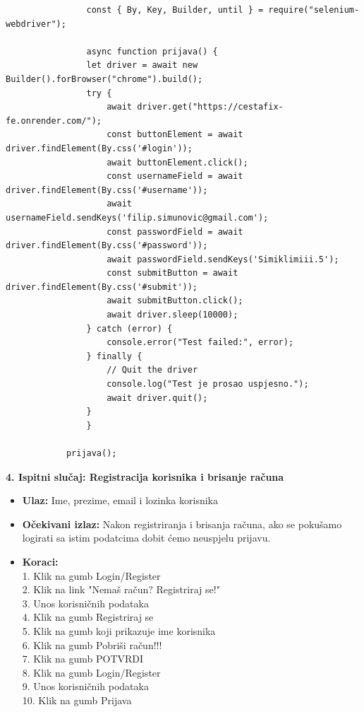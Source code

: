 			\begin{verbatim}
				const { By, Key, Builder, until } = require("selenium-webdriver");

				async function prijava() {
				let driver = await new Builder().forBrowser("chrome").build();
				try {
					await driver.get("https://cestafix-fe.onrender.com/");
					const buttonElement = await driver.findElement(By.css('#login'));
					await buttonElement.click();
					const usernameField = await driver.findElement(By.css('#username'));
					await usernameField.sendKeys('filip.simunovic@gmail.com');
					const passwordField = await driver.findElement(By.css('#password'));
					await passwordField.sendKeys('Simiklimiii.5');
					const submitButton = await driver.findElement(By.css('#submit'));
					await submitButton.click();
					await driver.sleep(10000);
				} catch (error) {
					console.error("Test failed:", error);
				} finally {
					// Quit the driver
					console.log("Test je prosao uspjesno.");
					await driver.quit();
				}
				}

			prijava();
			\end{verbatim}

			\textbf{4. Ispitni slučaj: Registracija korisnika i brisanje računa}
			 \begin{itemize}
				\item \textbf{Ulaz:} Ime, prezime, email i lozinka korisnika
				\item \textbf{Očekivani izlaz:} Nakon registriranja i brisanja računa, ako se pokušamo logirati sa istim podatcima dobit ćemo neuspjelu prijavu.
				\item \textbf{Koraci:} 
				\\ 1. Klik na gumb Login/Register
				\\ 2. Klik na link "Nemaš račun? Registriraj se!"
				\\ 3. Unos korisničnih podataka
				\\ 4. Klik na gumb Registriraj se
				\\ 5. Klik na gumb koji prikazuje ime korisnika
				\\ 6. Klik na gumb Pobriši račun!!!
				\\ 7. Klik na gumb POTVRDI
				\\ 8. Klik na gumb Login/Register
				\\ 9. Unos korisničnih podataka
				\\ 10. Klik na gumb Prijava
			\end{itemize}

